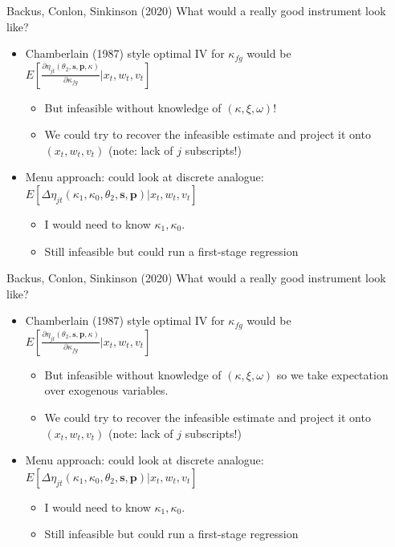 \documentclass[xcolor=pdftex,dvipsnames,table,mathserif,aspectratio=169]{beamer}
\begin{document}
\begin{frame}{Backus, Conlon, Sinkinson (2020)}
What would a really good instrument look like?
\begin{itemize}
\item Chamberlain (1987) style optimal IV for $\kappa_{fg}$ would be $E\left[\frac{\partial \eta_{jt}(\theta_2,\mathbf{s},\mathbf{p},\kappa)}{\partial \kappa_{fg}} | x_{t}, w_{t}, v_{t}\right]$
\begin{itemize}
\item But infeasible without knowledge of $(\kappa,\xi,\omega)$!
\item We could try to recover the infeasible estimate and project it onto $(x_t,w_t,v_t)$ (note: lack of $j$ subscripts!)
\end{itemize}
\item Menu approach: could look at discrete analogue: $E\left[\Delta \eta_{jt}(\kappa_1,\kappa_0,\theta_2,\mathbf{s},\mathbf{p}) | x_{t}, w_{t}, v_{t}\right]$
\begin{itemize}
\item I would need to know $\kappa_1,\kappa_0$.
\item Still infeasible but could run a first-stage regression
\end{itemize}
\end{itemize}
\end{frame}



\begin{frame}{Backus, Conlon, Sinkinson (2020)}
What would a really good instrument look like?
\begin{itemize}
\item Chamberlain (1987) style optimal IV for $\kappa_{fg}$ would be $E\left[\frac{\partial \eta_{jt}(\theta_2,\mathbf{s},\mathbf{p},\kappa)}{\partial \kappa_{fg}} | x_{t}, w_{t}, v_{t}\right]$
\begin{itemize}
\item But infeasible without knowledge of $(\kappa,\xi,\omega)$ so we take expectation over exogenous variables.
\item We could try to recover the infeasible estimate and project it onto $(x_t,w_t,v_t)$ (note: lack of $j$ subscripts!)
\end{itemize}
\item Menu approach: could look at discrete analogue: $E\left[\Delta \eta_{jt}(\kappa_1,\kappa_0,\theta_2,\mathbf{s},\mathbf{p}) | x_{t}, w_{t}, v_{t}\right]$
\begin{itemize}
\item I would need to know $\kappa_1,\kappa_0$.
\item Still infeasible but could run a first-stage regression
\end{itemize}
\end{itemize}
\end{frame}
\end{document}
